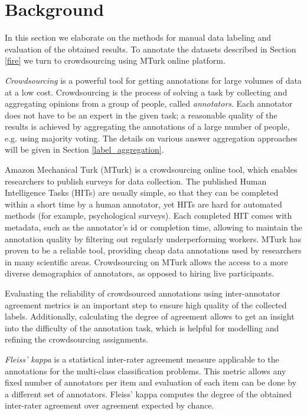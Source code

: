 \section{Background}

In this section we elaborate on the methods for manual data labeling and evaluation of the obtained results. To annotate the datasets described in Section \ref{fire} we turn to crowdsourcing using MTurk online platform.

\textit{Crowdsourcing} is a powerful tool for getting annotations for large volumes of data at a low cost. Crowdsourcing is the process of solving a task by collecting and aggregating opinions from a group of people, called \textit{annotators}. Each annotator does not have to be an expert in the given task; a reasonable quality of the results is achieved by aggregating the annotations of a large number of people, e.g. using majority voting. The details on various answer aggregation approaches will be given in Section \ref{label_aggregation}.

 Amazon Mechanical Turk (\gls{MTurk}) is a crowdsourcing online tool, which enables researchers to publish surveys for data collection. The published Human Intelligence Tasks (HITs) are usually simple, so that they can be completed within a short time by a human annotator, yet HITs are hard for automated methods (for example, psychological surveys). Each completed HIT comes with metadata, such as the annotator's id or completion time, allowing to maintain the annotation quality by filtering out regularly underperforming workers. MTurk has proven to be a reliable tool, providing cheap data annotations \cite{peer2017beyond} used by researchers in many scientific areas. Crowdsourcing on MTurk allows the access to a more diverse demographics of annotators, as opposed to hiring live participants.

 Evaluating the reliability of crowdsourced annotations using inter-annotator agreement metrics
is an important step to ensure high quality of the collected labels. Additionally, calculating the degree of agreement allows to get an insight into the difficulty of the annotation task, which is helpful for modelling and refining the crowdsourcing assignments.

\textit{Fleiss' kappa} \cite{fleiss1971measuring} is a statistical inter-rater agreement measure applicable to the annotations for the multi-class classification problems. This metric allows any fixed number of annotators per item and evaluation of each item can be done by a different set of annotators. Fleiss' kappa computes the degree of the obtained inter-rater agreement over agreement expected by chance.

